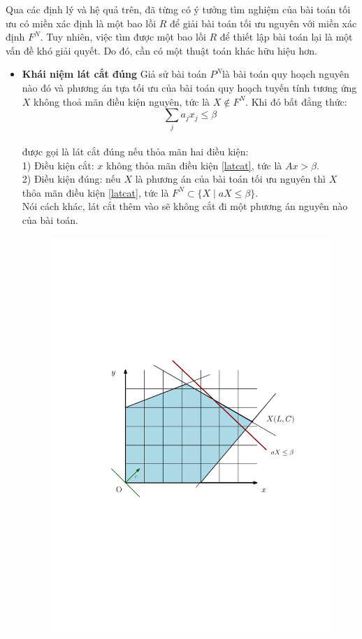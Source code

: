 \documentclass[12pt,a4paper]{report}
\begin{document}
Qua các định lý và hệ quả trên, đã từng có ý tưởng tìm nghiệm của bài toán tối ưu có miền xác định là một bao lồi $R$ để giải bài toán tối ưu nguyên với miền xác định $F^N$. Tuy nhiên, việc tìm được một bao lồi $R$ để thiết lập bài toán lại là một vấn đề khó giải quyết. Do đó, cần có một thuật toán khác hữu hiệu hơn.\\ 
\begin{itemize}
    \item \textbf{Khái niệm lát cắt đúng}
    Giả sử bài toán $P^N$là bài toán quy hoạch nguyên nào đó và phương án tựa tối ưu của bài toán quy hoạch tuyến tính tương ứng $X$ không thoả mãn điều kiện 
nguyên, tức là $X \notin  F^N$. Khi đó bất đẳng thức:
    $$\sum _j a_jx_j \le \beta$$\label{latcat}\\
    được gọi là lát cắt đúng nếu thỏa mãn hai điều kiện:\\
    1) Điều kiện cắt: $x$ không thỏa mãn điều kiện \eqref{latcat}, tức là $Ax > \beta$.\\
    2) Điều kiện đúng: nếu $X$ là phương án của bài toán tối ưu nguyên thì $X$ thỏa mãn điều kiện \eqref{latcat}, tức là 
 $F^N \subset \{X\mid aX\le \beta\}$.\\
    Nói cách khác, lát cắt thêm vào sẽ không cắt đi một phương án nguyên nào của bài toán.\\
    
    
    \begin{figure}[h]
        \centering
        \includegraphics[width=0.8\linewidth]{anh2.pdf}
       

\end{figure}
\end{itemize}
\end{document}
